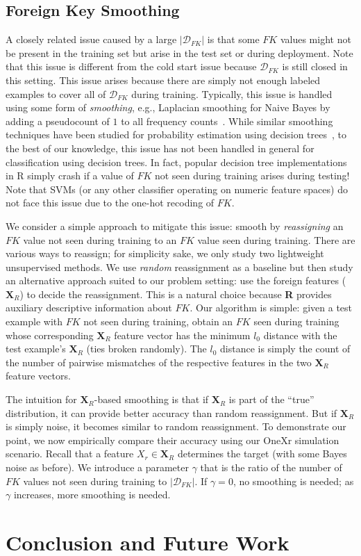 \documentclass[sigconf]{acmart}
\begin{document}
\subsection{Foreign Key Smoothing}

A closely related issue caused by a large $|\mathcal{D}_{FK}|$ is that some $FK$ values might not be present in the training set but arise 
in the test set or during deployment. Note that this issue is different from the cold start issue because $\mathcal{D}_{FK}$ is still closed 
in this setting. This issue arises because there are simply not enough labeled examples to cover 
all of $\mathcal{D}_{FK}$ during training. Typically, this issue is handled using some form of \textit{smoothing}, e.g., Laplacian smoothing
for Naive Bayes by adding a pseudocount of $1$ to all frequency counts~\cite{mitchellbook}.
While similar smoothing techniques have been studied for probability estimation using decision trees~\cite{pedro2003}, to the best of our knowledge, 
this issue has not been handled in general for classification using decision trees. In fact, popular decision tree implementations in R simply 
crash if a value of $FK$ not seen during training arises during testing! Note that SVMs (or any other classifier operating on numeric 
feature spaces) do not face this issue due to the one-hot recoding of $FK$. 

We consider a simple approach to mitigate this issue: smooth by \textit{reassigning} an $FK$ value not seen during training to an $FK$ value 
seen during training. There are various ways to reassign; for simplicity sake, we only study two lightweight unsupervised methods. 
We use \textit{random} reassignment as a baseline but then study an alternative approach suited to our problem setting: use the foreign features 
($\textbf{X}_R$) to decide the reassignment. This is a natural choice because \textbf{R} provides auxiliary descriptive information about $FK$.
Our algorithm is simple: given a test example with $FK$ not seen during training, obtain an $FK$ seen during training whose corresponding 
$\textbf{X}_R$ feature vector has the minimum $l_0$ distance with the test example's $\textbf{X}_R$ (ties broken randomly). The $l_0$ distance is
simply the count of the number of pairwise mismatches of the respective features in the two $\textbf{X}_R$ feature vectors. 

The intuition for $\textbf{X}_R$-based smoothing is that if $\textbf{X}_R$ is part of the ``true'' distribution, it can provide better accuracy 
than random reassignment. But if $\textbf{X}_R$ is simply noise, it becomes similar to random reassignment.
To demonstrate our point, we now empirically compare their accuracy using our OneXr simulation scenario. Recall that a feature $X_r \in \textbf{X}_R$
determines the target (with some Bayes noise as before). We introduce a parameter $\gamma$ that is the ratio of the number of $FK$ values not seen 
during training to $|\mathcal{D}_{FK}|$. If $\gamma = 0$, no smoothing is needed; as $\gamma$ increases, more smoothing is needed.




\section{Conclusion and Future Work}





\end{document}
